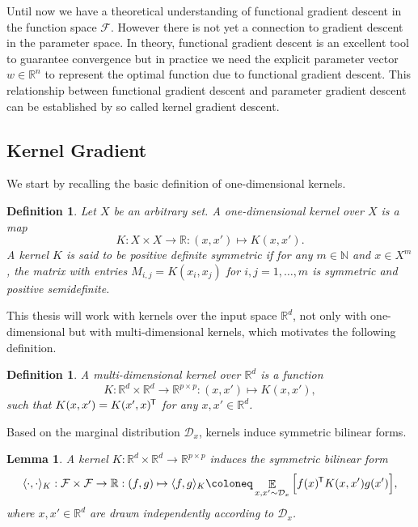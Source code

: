 \documentclass[11pt, a4paper]{article}
\newtheorem{lemma}[theorem]{Lemma}
\newtheorem{definition}[theorem]{Definition}
\newcommand{\N}{\mathbb{N}}
\newcommand{\R}{\mathbb{R}}
\newcommand{\D}{\mathcal{D}}
\newcommand{\F}{\mathcal{F}}
\newcommand*{\tr}{^{\mkern-1.5mu\mathsf{T}}}
\DeclareMathOperator*{\E}{\mathbb{E}}
\begin{document}
Until now we have a theoretical understanding of functional gradient descent in the function space $\F$. However there is not yet a connection to gradient descent in the parameter space. In theory, functional gradient descent is an excellent tool to guarantee convergence but in practice we need the explicit parameter vector $w \in \R^n$ to represent the optimal function due to functional gradient descent. This relationship between functional gradient descent and parameter gradient descent can be established by so called kernel gradient descent. 

\subsection{Kernel Gradient}

We start by recalling the basic definition of one-dimensional kernels.

\begin{definition}
Let $X$ be an arbitrary set. A one-dimensional kernel over $X$ is a map 
\[ K: X \times X \to \R : (x,x') \mapsto K(x,x').\]
A kernel $K$ is said to be positive definite symmetric if for any $m \in \N$ and $x \in X^m$, the matrix with entries $M_{i,j} = K(x_i,x_j)$ for $i,j = 1, \dots, m$ is symmetric and positive semidefinite.
\end{definition}

This thesis will work with kernels over the input space $\R^d$, not only with one-dimensional but with multi-dimensional kernels, which motivates the following definition.

\begin{definition}
A multi-dimensional kernel over $\R^d$ is a function
\[ K: \R^d \times \R^d \to \R^{p \times p} : (x,x') \mapsto K(x,x'), \]
such that $K(x,x') = K(x',x)\tr $ for any $x,x' \in \R^d$.
\end{definition}

Based on the marginal distribution $\D_x$, kernels induce symmetric bilinear forms.

\begin{lemma} \label{lem:form}
A kernel $K: \R^d \times \R^d \to \R^{p \times p}$ induces the symmetric bilinear form
\[ \langle \cdot, \cdot \rangle_K : \F \times \F \to \R : (f,g) \mapsto \langle f , g \rangle _K \coloneq \E_{x,x' \sim \D_x} \Big [ f(x)\tr  K(x,x') g(x') \Big ], \]
where $x, x' \in \R^d$ are drawn independently according to $\D_x$. 
\end{lemma}
\end{document}
